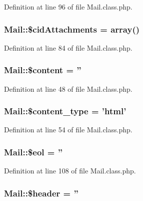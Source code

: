 Definition at line 96 of file Mail.\-class.\-php.

\hypertarget{classMail_a66c6752b550e4e8fd79a63b62815f48f}{
\subsubsection[{\$cid\-Attachments}]{\setlength{\rightskip}{0pt plus 5cm}Mail\-::\$cid\-Attachments = array()}}\label{classMail_a66c6752b550e4e8fd79a63b62815f48f}


Definition at line 84 of file Mail.\-class.\-php.

\hypertarget{classMail_a5a3320973718a2ca8a3fe798bf79c624}{
\subsubsection[{\$content}]{\setlength{\rightskip}{0pt plus 5cm}Mail\-::\$content = ''}}\label{classMail_a5a3320973718a2ca8a3fe798bf79c624}


Definition at line 48 of file Mail.\-class.\-php.

\hypertarget{classMail_ac933733b17efbb4978a46e557d32c440}{
\subsubsection[{\$content\-\_\-type}]{\setlength{\rightskip}{0pt plus 5cm}Mail\-::\$content\-\_\-type = 'html'}}\label{classMail_ac933733b17efbb4978a46e557d32c440}


Definition at line 54 of file Mail.\-class.\-php.

\hypertarget{classMail_acaebf19cba0b8be83989e241c96f9eb7}{
\subsubsection[{\$eol}]{\setlength{\rightskip}{0pt plus 5cm}Mail\-::\$eol = ''}}\label{classMail_acaebf19cba0b8be83989e241c96f9eb7}


Definition at line 108 of file Mail.\-class.\-php.

\hypertarget{classMail_ace98431d0944d23544743094b443d506}{
\subsubsection[{\$header}]{\setlength{\rightskip}{0pt plus 5cm}Mail\-::\$header = ''}}\label{classMail_ace98431d0944d23544743094b443d506}


